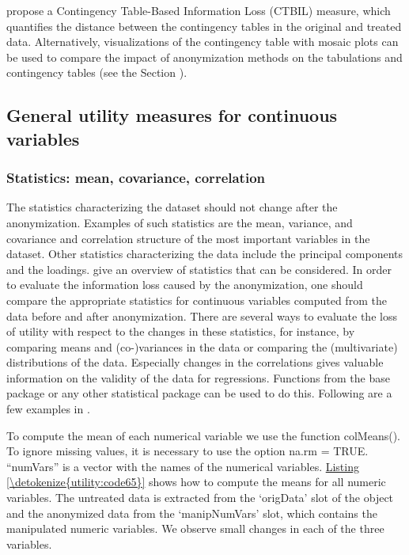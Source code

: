 \documentclass[letterpaper,10pt,english]{sphinxmanual}
\begin{document}
{\hyperref[\detokenize{utility:doto01b}]{}} propose a Contingency Table-Based
Information Loss (CTBIL) measure, which quantifies the distance between
the contingency tables in the original and treated data. Alternatively,
visualizations of the contingency table with mosaic plots can be used to
compare the impact of anonymization methods on the tabulations and
contingency tables (see the Section {\hyperref[\detokenize{utility:mosaic-plots}]{}}).


\subsection{General utility measures for continuous variables}
\label{\detokenize{utility:general-utility-measures-for-continuous-variables}}

\subsubsection{Statistics: mean, covariance, correlation}
\label{\detokenize{utility:statistics-mean-covariance-correlation}}
The statistics characterizing the dataset should not change after the
anonymization. Examples of such statistics are the mean, variance, and
covariance and correlation structure of the most important variables in
the dataset. Other statistics characterizing the data include the
principal components and the loadings. {\hyperref[\detokenize{utility:doto01b}]{}}
give an overview of statistics that can be considered. In order to
evaluate the information loss caused by the anonymization, one should
compare the appropriate statistics for continuous variables computed
from the data before and after anonymization. There are several ways to
evaluate the loss of utility with respect to the changes in these
statistics, for instance, by comparing means and (co-)variances in the
data or comparing the (multivariate) distributions of the data.
Especially changes in the correlations gives valuable information on the
validity of the data for regressions. Functions from the  base
package or any other statistical package can be used to do this.
Following are a few examples in .

To compute the mean of each numerical variable we use the function
colMeans(). To ignore missing values, it is necessary to use the option
na.rm = TRUE. “numVars” is a vector with the names of the numerical
variables. \hyperref[\detokenize{utility:code65}]{Listing \ref{\detokenize{utility:code65}}} shows how to compute the means for all numeric
variables. The untreated data is extracted from the ‘origData’ slot of
the  object and the anonymized data from the ‘manipNumVars’
slot, which contains the manipulated numeric variables. We observe small
changes in each of the three variables.
\end{document}
